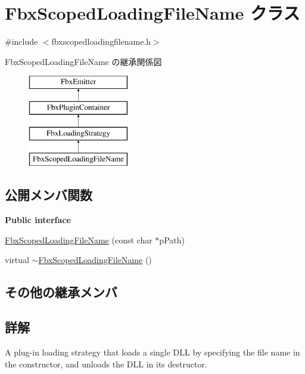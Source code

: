 \hypertarget{class_fbx_scoped_loading_file_name}{}\section{Fbx\+Scoped\+Loading\+File\+Name クラス}
\label{class_fbx_scoped_loading_file_name}


{\ttfamily \#include $<$fbxscopedloadingfilename.\+h$>$}

Fbx\+Scoped\+Loading\+File\+Name の継承関係図\begin{figure}[H]
\begin{center}
\leavevmode
\includegraphics[height=4.000000cm]{class_fbx_scoped_loading_file_name}
\end{center}
\end{figure}
\subsection*{公開メンバ関数}
\begin{Indent}\textbf{ Public interface}\par
\begin{DoxyCompactItemize}
\item 
\hyperlink{class_fbx_scoped_loading_file_name_a42319408c4e447d7b52965c5cc738a8e}{Fbx\+Scoped\+Loading\+File\+Name} (const char $\ast$p\+Path)
\item 
virtual \hyperlink{class_fbx_scoped_loading_file_name_a2f15050815bcb12cdd1b461e619374d6}{$\sim$\+Fbx\+Scoped\+Loading\+File\+Name} ()
\end{DoxyCompactItemize}
\end{Indent}
\subsection*{その他の継承メンバ}


\subsection{詳解}
A plug-\/in loading strategy that loads a single D\+LL by specifying the file name in the constructor, and unloads the D\+LL in its destructor. 

